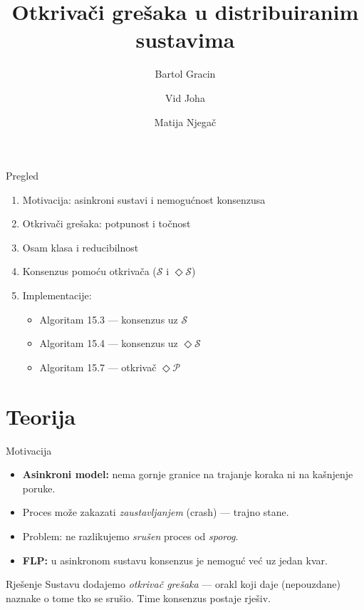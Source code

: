 \documentclass[aspectratio=169,11pt]{beamer}
\title{Otkrivači grešaka u distribuiranim sustavima}
\author{Bartol Gracin \and Vid Joha \and Matija Njegač}
\institute{Distribuirani procesi}
\date{}
\newcommand{\Ds}{\ensuremath{\mathcal{S}}}
\newcommand{\eP}{\ensuremath{\Diamond\mathcal{P}}}
\newcommand{\eS}{\ensuremath{\Diamond\mathcal{S}}}
\begin{document}
\begin{frame}
  \titlepage
\end{frame}

\begin{frame}{Pregled}
  \begin{enumerate}
    \item Motivacija: asinkroni sustavi i nemogućnost konsenzusa
    \item Otkrivači grešaka: potpunost i točnost
    \item Osam klasa i reducibilnost
    \item Konsenzus pomoću otkrivača (\Ds{} i \eS)
    \item Implementacije:
      \begin{itemize}
        \item Algoritam 15.3 --- konsenzus uz \Ds
        \item Algoritam 15.4 --- konsenzus uz \eS
        \item Algoritam 15.7 --- otkrivač \eP
      \end{itemize}
  \end{enumerate}
\end{frame}


\section{Teorija}

\begin{frame}{Motivacija}
  \begin{itemize}
    \item \textbf{Asinkroni model:} nema gornje granice na trajanje koraka ni na
      kašnjenje poruke.
    \item Proces može zakazati \emph{zaustavljanjem} (crash) --- trajno stane.
    \item Problem: ne razlikujemo \emph{srušen} proces od \emph{sporog}.
    \item \textbf{FLP:} u asinkronom sustavu konsenzus je nemoguć već uz jedan kvar.
  \end{itemize}
  \vfill
  \begin{block}{Rješenje}
    Sustavu dodajemo \emph{otkrivač grešaka} --- orakl koji daje (nepouzdane)
    naznake o tome tko se srušio. Time konsenzus postaje rješiv.
  \end{block}
\end{frame}
\end{document}
